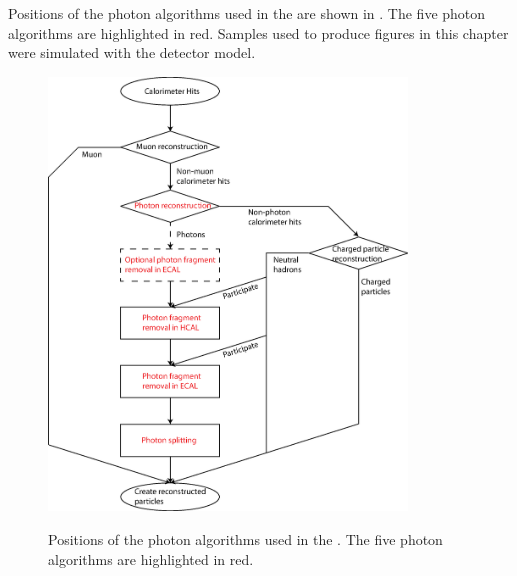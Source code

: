Positions of the photon algorithms used  in the \pandora are shown in . The five photon algorithms are highlighted in red. Samples used to produce figures in this chapter were simulated with the \ILD detector model.


\begin{figure}[tbph]
\centering
{\includegraphics[width=0.85\textwidth]{photon/photonAlgs2}}
\caption[A flow diagram of the \PhotonReconstruction algorithm.]
{Positions of the photon algorithms used  in the \pandora. The five photon algorithms are highlighted in red.}
\label{fig:photonPhotonAlgs}
\end{figure}




